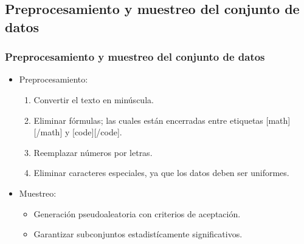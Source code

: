 \subsection{Preprocesamiento y muestreo del conjunto de datos}
\begin{frame}
	\frametitle{Preprocesamiento y muestreo del conjunto de datos}
	\begin{itemize}
		\item
		Preprocesamiento:
		\begin{enumerate}[<*>]
			\item Convertir el texto en minúscula.
			\item Eliminar fórmulas; las cuales están encerradas entre etiquetas [math][/math] y [code][/code].
			\item Reemplazar números por letras.
			\item Eliminar caracteres especiales, ya que los datos deben ser uniformes.
		\end{enumerate}

		\bigskip
		\item
		Muestreo:
		\begin{itemize}[<*>]
			\item Generación pseudoaleatoria con criterios de aceptación.
			\item Garantizar subconjuntos estadistícamente significativos.
		\end{itemize}
	\end{itemize}

\end{frame}

